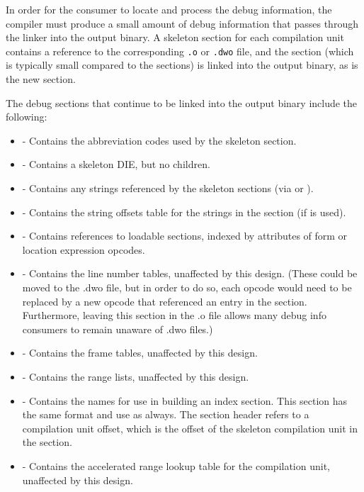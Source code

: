 In order for the consumer to locate and process the debug
information, the compiler must produce a small amount of debug
information that passes through the linker into the output
binary. A skeleton \dotdebuginfo{} section for each compilation unit
contains a reference to the corresponding \texttt{.o} or \texttt{.dwo}
file, and the \dotdebugline{} section (which is typically small
compared to the \dotdebuginfo{} sections) is
linked into the output binary, as is the new \dotdebugaddr{}
section.

The debug sections that continue to be linked into the
output binary include the following:
\begin{itemize}
\item
\dotdebugabbrev{} - Contains the abbreviation codes used by the
skeleton \dotdebuginfo{} section.
\item
\dotdebuginfo{} - Contains a skeleton \DWTAGcompileunit{} DIE,
but no children.
\item
\dotdebugstr{} - Contains any strings referenced by the skeleton
\dotdebuginfo{} sections (via \DWFORMstrp{} or \DWFORMstrx{}).
\item
\dotdebugstroffsets{} - Contains the string offsets table for
the strings in the \dotdebugstr{} section (if \DWFORMstrx is used).
\item
\dotdebugaddr{} - Contains references to loadable sections,
indexed by attributes of form \DWFORMaddrx{} or location
expression \DWOPaddrx{} opcodes.
\item
\dotdebugline{} - Contains the line number tables, unaffected by
this design. (These could be moved to the .dwo file, but in
order to do so, each \DWLNEsetaddress{} opcode would need to
be replaced by a new opcode that referenced an entry in the
\dotdebugaddr{} section. Furthermore, leaving this section in the
.o file allows many debug info consumers to remain unaware of
.dwo files.)
\item
\dotdebugframe{} - Contains the frame tables, unaffected by this
design.
\item
\dotdebugranges{} - Contains the range lists, unaffected by this
design.
\item
\dotdebugnames{} - Contains the names for use in
building an index section. This section has the same
format and use as always. The section header refers to a
compilation unit offset, which is the offset of the
skeleton compilation unit in the \dotdebuginfo{} section.
\item
\dotdebugaranges{} - Contains the accelerated range lookup table
for the compilation unit, unaffected by this design.
\end{itemize}

